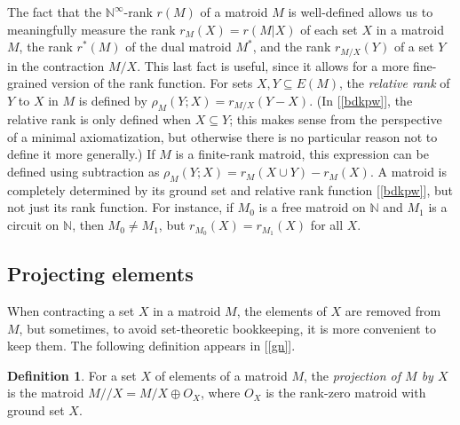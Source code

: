 \documentclass{amsart}
\theoremstyle{plain}
\newcounter{defn}
\theoremstyle{definition}
\newtheorem{definition}[defn]{Definition}
\newcommand{\bN}{\mathbb N}
\newcommand{\dcon}{/ \!\! /}
\newcommand{\enn}{\mathbb{N}^{\infty}}
\newcommand{\con}{/}
\renewcommand{\ss}{\subseteq}
\newcommand{\relrank}[3]{\rho_{#1}({#2};{#3})}
\begin{document}
The fact that the $\enn$-rank $r(M)$ of a matroid $M$ is well-defined allows us to 
meaningfully measure the rank $r_M(X) = r(M | X)$ of each set $X$ in a matroid $M$, 
the rank $r^*(M)$ of the dual matroid $M^*$, and the rank $r_{M \con X}(Y)$ 
of a set $Y$ in the contraction $M \con X$. This last fact is useful, since 
it allows for a more fine-grained version of the rank function. 
For sets $X,Y \ss E(M)$, the \emph{relative rank} of $Y$ to $X$ in $M$ 
is defined by $\relrank{M}{Y}{X} = r_{M \con X}(Y-X)$. 
(In [\ref{bdkpw}], the relative rank is only defined when $X \ss Y$;
this makes sense from the perspective of a minimal axiomatization, 
but otherwise there is no particular reason not to define it more generally.)
If $M$ is a finite-rank matroid,
this expression can be defined using subtraction as $\relrank{M}{Y}{X} = r_M(X \cup Y) - r_M(X)$. 
A matroid is completely determined by its ground set and relative 
rank function [\ref{bdkpw}], but not just its rank function. 
For instance, if $M_0$ is a free matroid on $\bN$ and $M_1$ is 
a circuit on $\bN$, then $M_0 \ne M_1$, but $r_{M_0}(X) = r_{M_1}(X)$ for all $X$. 

\subsection*{Projecting elements}
When contracting a set $X$ in a matroid $M$, the elements of $X$ are removed from $M$, 
but sometimes, to avoid set-theoretic bookkeeping, it is more convenient to keep them.
The following definition appears in [\ref{gn}].
\begin{definition}
  For a set $X$ of elements of a matroid $M$, the \emph{projection of $M$ by $X$} is the matroid $M \dcon X = M \con X \oplus O_X$,
where $O_X$ is the rank-zero matroid with ground set $X$.   
\end{definition}
\end{document}
